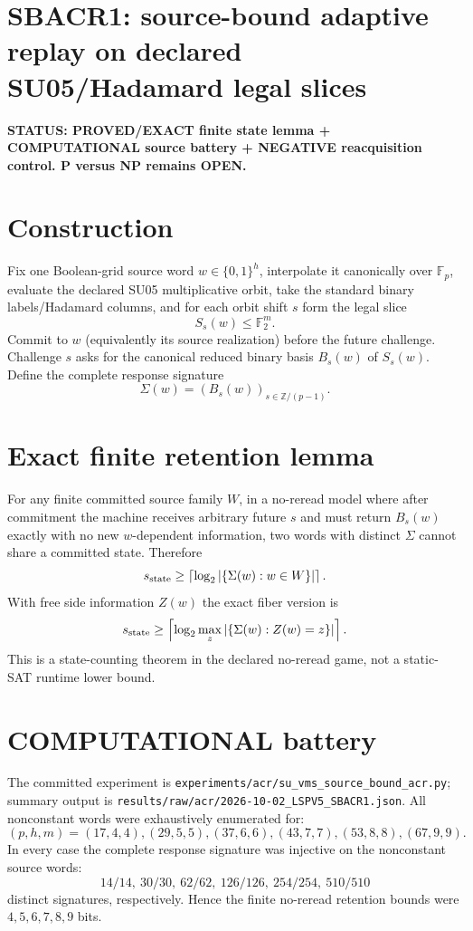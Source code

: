 \documentclass[11pt]{article}\usepackage[margin=.88in]{geometry}\usepackage{amsmath,amssymb,booktabs}
\begin{document}
\section*{SBACR1: source-bound adaptive replay on declared SU05/Hadamard legal slices}
\textbf{STATUS: PROVED/EXACT finite state lemma + COMPUTATIONAL source battery + NEGATIVE reacquisition control. P versus NP remains OPEN.}

\section*{Construction}
Fix one Boolean-grid source word $w\in\{0,1\}^h$, interpolate it canonically over $\mathbb F_p$, evaluate the declared SU05 multiplicative orbit, take the standard binary labels/Hadamard columns, and for each orbit shift $s$ form the legal slice
\[
S_s(w)\le\mathbb F_2^m.
\]
Commit to $w$ (equivalently its source realization) before the future challenge. Challenge $s$ asks for the canonical reduced binary basis $B_s(w)$ of $S_s(w)$. Define the complete response signature
\[
\Sigma(w)=(B_s(w))_{s\in\mathbb Z/(p-1)}.
\]

\section*{Exact finite retention lemma}
For any finite committed source family $W$, in a no-reread model where after commitment the machine receives arbitrary future $s$ and must return $B_s(w)$ exactly with no new $w$-dependent information, two words with distinct $\Sigma$ cannot share a committed state. Therefore
\[
s_{\rm state}\ge \left\lceil\log_2|\{\Sigma(w):w\in W\}|\right\rceil.
\]
With free side information $Z(w)$ the exact fiber version is
\[
s_{\rm state}\ge\left\lceil\log_2\max_z|\{\Sigma(w):Z(w)=z\}|\right\rceil.
\]
This is a state-counting theorem in the declared no-reread game, not a static-SAT runtime lower bound.

\section*{COMPUTATIONAL battery}
The committed experiment is \texttt{experiments/acr/su\_vms\_source\_bound\_acr.py}; summary output is \texttt{results/raw/acr/2026-10-02\_LSPV5\_SBACR1.json}. All nonconstant words were exhaustively enumerated for:
\[
(p,h,m)=(17,4,4),(29,5,5),(37,6,6),(43,7,7),(53,8,8),(67,9,9).
\]
In every case the complete response signature was injective on the nonconstant source words:
\[
14/14,\ 30/30,\ 62/62,\ 126/126,\ 254/254,\ 510/510
\]
distinct signatures, respectively. Hence the finite no-reread retention bounds were $4,5,6,7,8,9$ bits.
\end{document}
